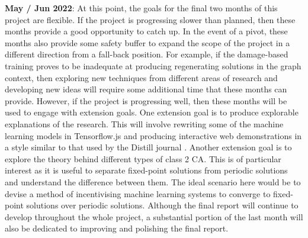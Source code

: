\textbf{May / Jun 2022}: At this point, the goals for the final two months of this project are flexible. If the project is progressing slower than planned, then these months provide a good opportunity to catch up. In the event of a pivot, these months also provide some safety buffer to expand the scope of the project in a different direction from a fall-back position. For example, if the damage-based training proves to be inadequate at producing regenerating solutions in the graph context, then exploring new techniques from different areas of research and developing new ideas will require some additional time that these months can provide.
However, if the project is progressing well, then these months will be used to engage with extension goals.
One extension goal is to produce explorable explanations of the research.
This will involve rewriting some of the machine learning models in Tensorflow.js and producing interactive web demonstrations in a style similar to that used by the Distill journal \cite{distill}.
Another extension goal is to explore the theory behind different types of class 2 CA.
This is of particular interest as it is useful to separate fixed-point solutions from periodic solutions and understand the difference between them.
The ideal scenario here would be to devise a method of incentivising machine learning systems to converge to fixed-point solutions over periodic solutions.
Although the final report will continue to develop throughout the whole project, a substantial portion of the last month will also be dedicated to improving and polishing the final report.
    